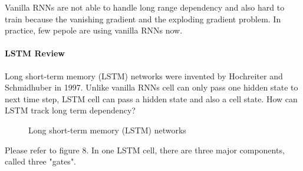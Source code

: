 \documentclass[10pt,twocolumn,letterpaper]{article}
\begin{document}
\par
Vanilla RNNs are not able to handle long range dependency and also hard to train because the vanishing gradient and the exploding gradient problem. In practice, few pepole are using vanilla RNNs now.

\paragraph{LSTM Review}
\par

Long short-term memory (LSTM) networks were invented by Hochreiter and Schmidhuber in 1997\cite{Authors11}. Unlike vanilla RNNs cell can only pass one hidden state to next time step, LSTM cell can pass a hidden state and also a cell state. How can LSTM track long term dependency?

\begin{figure}[H]
\begin{center}
\end{center}
   \caption{Long short-term memory (LSTM) networks \cite{Authors12}}
\end{figure}


Please refer to figure 8. In one LSTM cell, there are three major components, called three "gates".
\end{document}
